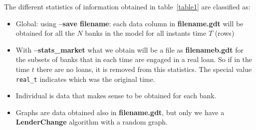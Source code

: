\documentclass{article}
\begin{document}
The different statistics of information obtained in table~\ref{table1} are classified as:
\begin{itemize}
        \item Global: using \textbf{--save filename}: each data column in \textbf{filename.gdt}  will be obtained for all the $N$ banks in the model for all instants time $T$ (rows)
        \item With \textbf{--stats\_market} what we obtain will be a file as \textbf{filenameb.gdt} for the subsets of banks that in each time are engaged in a real loan. So if in the time $t$ there are no loans, it is removed from this statistics. The special value \texttt{real\_t} indicates which was the original time.
        \item Individual is data that makes sense to be obtained for each bank.
        \item Graphs are data obtained also in \textbf{filename.gdt}, but only we have a \textbf{LenderChange} algorithm with a random graph.
\end{itemize}
\end{document}

